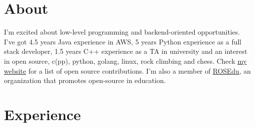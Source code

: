 \documentclass[line, margin]{resume}
\begin{document}
\renewcommand{\namefont}{ \LARGE \bf }


\address{\href{mailto:andrei@linux.com}{andrei@linux.com}}
\address{\href{http://andreipetre.ro}{andreipetre.ro}}

\begin{resume}



    \section{About}

I'm excited about low-level programming and backend-oriented opportunities. I've got 4.5 years Java experience in AWS, 5 years Python experience as a full stack developer, 1.5 years C++ experience as a TA in university and an interest in open source, c(pp), python, golang, linux, rock climbing and chess. Check \href{http://andreipetre.ro}{my website} for a list of open source contributions. I'm also a member of \href{http://rosedu.org}{ROSEdu}, an organization that promotes open-source in education.

\section{Experience}


\end{resume}
\end{document}
